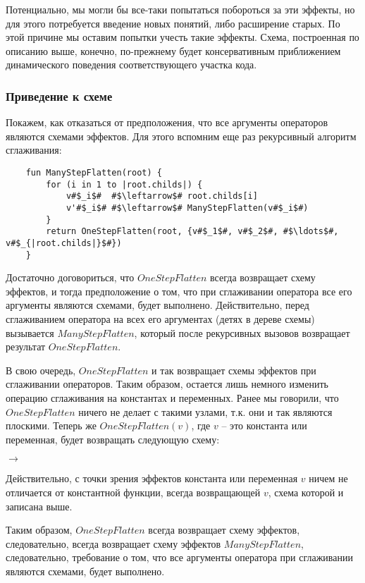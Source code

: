 Потенциально, мы могли бы все-таки попытаться побороться за эти эффекты, но для этого потребуется введение новых понятий, либо расширение старых. По этой причине мы оставим попытки учесть такие эффекты. Схема, построенная по описанию выше, конечно, по-прежнему будет консервативным приближением динамического поведения соответствующего участка кода. 




\subsubsection{Приведение к схеме}

Покажем, как отказаться от предположения, что все аргументы операторов являются схемами эффектов. Для этого вспомним еще раз рекурсивный алгоритм сглаживания:

\begin{verbatim}
	fun ManyStepFlatten(root) {
	    for (i in 1 to |root.childs|) {
		    v#$_i$#  #$\leftarrow$# root.childs[i]
		    v'#$_i$# #$\leftarrow$# ManyStepFlatten(v#$_i$#) 
	    }
	    return OneStepFlatten(root, {v#$_1$#, v#$_2$#, #$\ldots$#, v#$_{|root.childs|}$#})
	}
\end{verbatim}

Достаточно договориться, что $OneStepFlatten$ всегда возвращает схему эффектов, и тогда предположение о том, что при сглаживании оператора все его аргументы являются схемами, будет выполнено. Действительно, перед сглаживанием оператора на всех его аргументах (детях в дереве схемы) вызывается $ManyStepFlatten$, который после рекурсивных вызовов возвращает результат $OneStepFlatten$.

В свою очередь, $OneStepFlatten$ и так возвращает схемы эффектов при сглаживании операторов. Таким образом, остается лишь немного изменить операцию сглаживания на константах и переменных. Ранее мы говорили, что $OneStepFlatten$ ничего не делает с такими узлами, т.к. они и так являются плоскими. Теперь же $OneStepFlatten(v)$, где $v$ -- это константа или переменная, будет возвращать следующую схему: 

{
	 $\rightarrow$ 	
}{}

Действительно, с точки зрения эффектов константа или переменная $v$ ничем не отличается от константной функции, всегда возвращающей $v$, схема которой и записана выше. 

Таким образом, $OneStepFlatten$ всегда возвращает схему эффектов, следовательно, всегда возвращает схему эффектов $ManyStepFlatten$, следовательно, требование о том, что все аргументы оператора при сглаживании являются схемами, будет выполнено.


